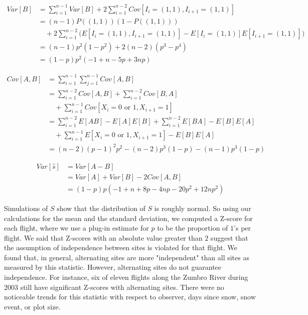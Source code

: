 \documentclass[12pt]{article}
\begin{document}
    \begin{equation*}
        \begin{split}
        Var[B]& =\sum_{i=1}^{n-1}Var[B]+2\sum_{i=1}^{n-2}Cov[I_i=(1,1),I_{i+1}=
                (1,1)] \\
              & =(n-1)P((1, 1))(1-P((1, 1))) \\
              & \quad +2\sum_{i=1}^{n-2}\bigg(E[I_i=(1,1),I_{i+1}=(1,1)]-E[I_i=
                (1,1)]E[I_{i+1}=(1,1)]\bigg) \\
              & =(n-1)p^2(1-p^2)+2(n-2)(p^3-p^4) \\
              & =(1-p)p^2(-1+n-5p+3np)
        \end{split}
    \end{equation*}

    \begin{equation*}
        \begin{split}
        Cov[A,B]& =\sum_{i=1}^{n-1}\sum_{j=1}^{n-1}Cov[A,B] \\
                & =\sum_{i=1}^{n-2}Cov[A,B]+\sum_{i=1}^{n-2}Cov[B,A] \\
                & \quad +\sum_{i=1}^{n-1}Cov[X_i=0\text{ or }1,X_{i+1}=1] \\
                & =\sum_{i=1}^{n-2}E[AB]-E[A]E[B]+\sum_{i=1}^{n-2}E[BA]-
                  E[B]E[A] \\
                & \quad +\sum_{i=1}^{n-1}E[X_i=0\text{ or }1,X_{i+1}=1]-
                  E[B]E[A] \\
                & =(n-2)(p-1)^2p^2-(n-2)p^3(1-p)-(n-1)p^3(1-p)
        \end{split}
    \end{equation*}

    \begin{equation*}
        \begin{split}
        Var[\hat{s}]& =Var[A-B] \\
                    & =Var[A]+Var[B]-2Cov[A,B] \\
                    & =(1-p)p(-1+n+8p-4np-20p^2+12np^2)
        \end{split}
    \end{equation*}

    Simulations of \(S\) show that the distribution of \(S\) is roughly normal.
    So using our calculations for the mean and the standard deviation, we
    computed a Z-score for each flight, where we use a plug-in estimate for
    \(p\) to be the proportion of \(1\)'s per flight. We said that Z-scores with
    an absolute value greater than \(2\) suggest that the assumption of
    independence between sites is violated for that flight. We found that, in
    general, alternating sites are more "independent" than all sites as measured
    by this statistic. However, alternating sites do not guarantee independence.
    For instance, six of eleven flights along the Zumbro River during 2003 still
    have significant Z-scores with alternating sites. There were no noticeable
    trends for this statistic with respect to observer, days since snow, snow
    event, or plot size.
\end{document}
